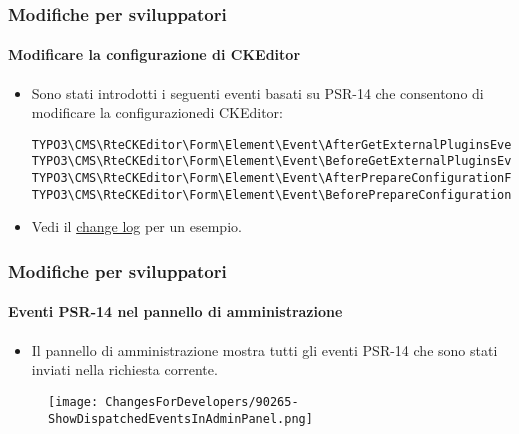 
\begin{frame}[fragile]
	\frametitle{Modifiche per sviluppatori}
	\framesubtitle{Modificare la configurazione di CKEditor}

	\lstset{basicstyle=\tiny\ttfamily}

	\begin{itemize}
		\item Sono stati introdotti i seguenti eventi basati su PSR-14 che consentono di modificare la configurazionedi CKEditor:

\vspace{-0.4cm}
\begin{lstlisting}
TYPO3\CMS\RteCKEditor\Form\Element\Event\AfterGetExternalPluginsEvent
TYPO3\CMS\RteCKEditor\Form\Element\Event\BeforeGetExternalPluginsEvent
TYPO3\CMS\RteCKEditor\Form\Element\Event\AfterPrepareConfigurationForEditorEvent
TYPO3\CMS\RteCKEditor\Form\Element\Event\BeforePrepareConfigurationForEditorEvent
\end{lstlisting}

		\item Vedi il
			\href{https://docs.typo3.org/c/typo3/cms-core/master/en-us/Changelog/10.3/Feature-88818-IntroduceEventsToModifyCKEditorConfiguration.html}{change log}
			per un esempio.
	\end{itemize}

\end{frame}


\begin{frame}[fragile]
	\frametitle{Modifiche per sviluppatori}
	\framesubtitle{Eventi PSR-14 nel pannello di amministrazione}

	\begin{itemize}
		\item Il pannello di amministrazione mostra tutti gli eventi PSR-14 che sono stati inviati nella richiesta corrente.
	\end{itemize}

	\begin{figure}
		\texttt{[image: ChangesForDevelopers/90265-ShowDispatchedEventsInAdminPanel.png]}
	\end{figure}

\end{frame}

